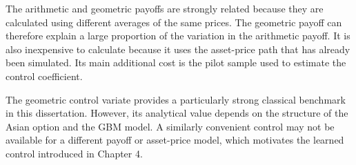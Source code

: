 The arithmetic and geometric payoffs are strongly related because they are calculated using different averages of the same prices. The geometric payoff can therefore explain a large proportion of the variation in the arithmetic payoff. It is also inexpensive to calculate because it uses the asset-price path that has already been simulated. Its main additional cost is the pilot sample used to estimate the control coefficient.

The geometric control variate provides a particularly strong classical benchmark in this dissertation. However, its analytical value depends on the structure of the Asian option and the GBM model. A similarly convenient control may not be available for a different payoff or asset-price model, which motivates the learned control introduced in Chapter 4.
